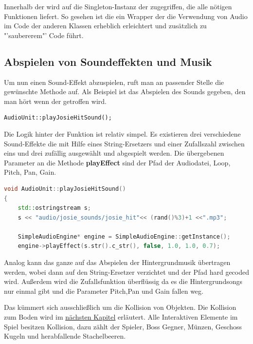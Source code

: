 Innerhalb der  wird auf die Singleton-Instanz der  zugegriffen, die alle nötigen Funktionen liefert. So gesehen ist die  ein Wrapper der die Verwendung von Audio im Code der anderen Klassen erheblich erleichtert und zusätzlich zu "'saubererem"' Code führt. 



\subsection{Abspielen von Soundeffekten und Musik} 
Um nun einen Sound-Effekt abzuspielen, ruft man an passender Stelle die gewünschte Methode auf. Als Beispiel ist das Abspielen des Sounds gegeben, den man hört wenn der  getroffen wird.

\begin{lstlisting}[style=singleline]
AudioUnit::playJosieHitSound();
\end{lstlisting}

Die Logik hinter der Funktion ist relativ simpel. Es existieren drei verschiedene Sound-Effekte die mit Hilfe eines String-Ersetzers und einer Zufallszahl zwischen eins und drei zufällig ausgewählt und abgespielt werden. Die übergebenen Parameter an die Methode \textbf{playEffect} sind der Pfad der Audiodatei, Loop, Pitch, Pan, Gain.

\begin{lstlisting}[label=lst:playJosieShootSound,
				   language=C++,
				   firstnumber=30,
				   caption=BossLevel Shoot Sound abspielen ( AudioUnit.cpp )]
void AudioUnit::playJosieHitSound()
{
	std::ostringstream s;
	s << "audio/josie_sounds/josie_hit"<< (rand()%3)+1 <<".mp3";

	SimpleAudioEngine* engine = SimpleAudioEngine::getInstance();
	engine->playEffect(s.str().c_str(), false, 1.0, 1.0, 0.7);
\end{lstlisting}

Analog kann das ganze auf das Abspielen der Hintergrundmusik übertragen werden, wobei dann auf den String-Ersetzer verzichtet und der Pfad hard gecoded wird. Außerdem wird die Zufallsfunktion überflüssig da es die Hintergrundsongs nur einmal gibt und die Parameter Pitch,Pan und Gain fallen weg.



\label{sec:4_CollisionLayer}

Das  kümmert sich ausschließlich um die Kollision von Objekten. Die Kollision zum Boden wird im \href{sec:4_Kollisionsabfrage}{nächsten Kapitel} erläutert. Alle Interaktiven Elemente im Spiel besitzen Kollision, dazu zählt der Spieler, Boss Gegner, Münzen, Geschoss Kugeln und herabfallende Stachelbeeren.

